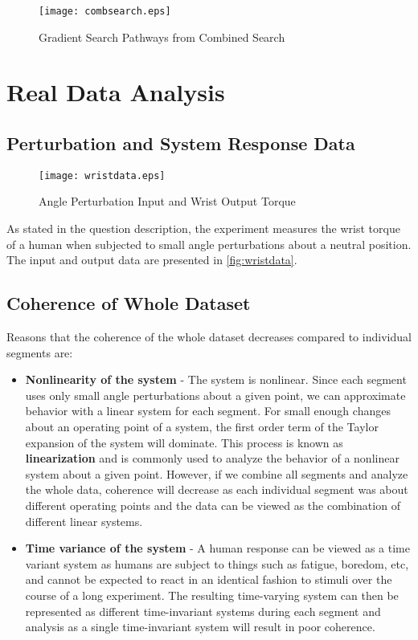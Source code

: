\documentclass[11pt,a4paper]{article}
\begin{document}
\begin{figure}
    \centering
    \texttt{[image: combsearch.eps]}
    \caption{Gradient Search Pathways from Combined Search}
    \label{fig:combsearch}
\end{figure}

\newpage
{}


\section{Real Data Analysis}

\subsection{Perturbation and System Response Data}
\begin{figure}
    \centering
    \texttt{[image: wristdata.eps]}
    \caption{Angle Perturbation Input and Wrist Output Torque}
    \label{fig:wristdata}
\end{figure}
As stated in the question description, the experiment measures the wrist torque
of a human when subjected to small angle perturbations about a neutral
position. The input and output data are presented in \autoref{fig:wristdata}.

\subsection{Coherence of Whole Dataset}
Reasons that the coherence of the whole dataset decreases compared to
individual segments are:
\begin{itemize}
    \item \textbf{Nonlinearity of the system} - The system is nonlinear. Since
        each segment uses only small angle perturbations about a given point,
        we can approximate behavior with a linear system for each segment. For
        small enough changes about an operating point of a system, the first
        order term of the Taylor expansion of the system will dominate. This
        process is known as \textbf{linearization} and is commonly used to
        analyze the behavior of a nonlinear system about a given point.
        However, if we combine all segments and analyze the whole data,
        coherence will decrease as each individual segment was about different
        operating points and the data can be viewed as the combination of
        different linear systems.
    \item \textbf{Time variance of the system} - A human response can be viewed
        as a time variant system as humans are subject to things such as
        fatigue, boredom, etc, and cannot be expected to react in an identical
        fashion to stimuli over the course of a long experiment. The resulting
        time-varying system can then be represented as different time-invariant
        systems during each segment and analysis as a single time-invariant
        system will result in poor coherence.
\end{itemize}
\end{document}
